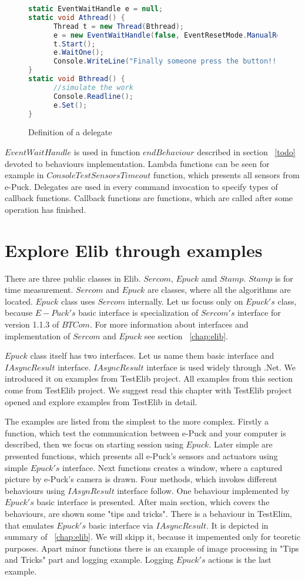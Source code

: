 		
\begin{figure}
\begin{lstlisting}[language=cs]
static EventWaitHandle e = null;
static void Athread() {
      Thread t = new Thread(Bthread);
      e = new EventWaitHandle(false, EventResetMode.ManualReset);
      t.Start();
      e.WaitOne();
      Console.WriteLine("Finally someone press the button!!!");
}
static void Bthread() {
      //simulate the work      
      Console.Readline();
      e.Set();
}
\end{lstlisting}
\caption{Definition of a delegate} \label{ewh}
\end{figure}

	 $EventWaitHandle$ is used in function $endBehaviour$ described in section ~\ref{todo} devoted to behaviours implementation.
	 Lambda functions can be seen for example in $ConsoleTestSensorsTimeout$ function, which presents all sensors from e-Puck.
	 Delegates are used in every command invocation to specify types of callback functions.
	 Callback functions are functions, which are called after some operation has finished.
	
\section{Explore Elib through examples} \label{sec:interfaces}
	There are three public classes in Elib. $Sercom$, $Epuck$ amd $Stamp$.
	$Stamp$ is for time measurement. $Sercom$ and $Epuck$ are classes, where all the algorithms are located.
	$Epuck$ class uses $Sercom$ internally.
	Let us focuss only on $Epuck's$ class, because $E-Puck's$ basic interface is specialization of $Sercom's$
	interface for version 1.1.3 of $BTCom$.
	For more information about interfaces and implementation of $Sercom$ and $Epuck$ see section ~\ref{chap:elib}.

	$Epuck$ class itself has two interfaces. Let us name them basic interface and $IAsyncResult$ interface.
	$IAsyncResult$ interface is used widely through .Net. We introduced it on examples from TestElib project.
	All examples from this section come from TestElib project. We suggest read this chapter with TestElib project opened
	and explore examples from TestElib in detail.

	The examples are listed from the simplest to the more complex. 
	Firstly a function, which test the communication between e-Puck and your computer is described,
	then we focus on starting session using $Epuck$.
	Later simple are presented functions, which presents all e-Puck's sensors and actuators using simple $Epuck's$ interface.
	Next functions creates a window, where a captured picture by e-Puck's camera is drawn.
	Four methods, which invokes different behaviours using $IAsynResult$ interface follow.
	One behaviour implemented by $Epuck's$ basic interface is presented.
	After main section, which covers the behaviours, are shown some "tips and tricks".
	There is a behaviour in TestElim, that emulates $Epuck's$ basic interface via $IAsyncResult$. It is depicted in summary of ~\ref{chap:elib}.
	We will skipp it, because it impemented only for teoretic purposes.
	Apart minor functions there is an example of image processing in "Tips and Tricks" part and logging example.
	Logging $Epuck's$ actions is the last example.


